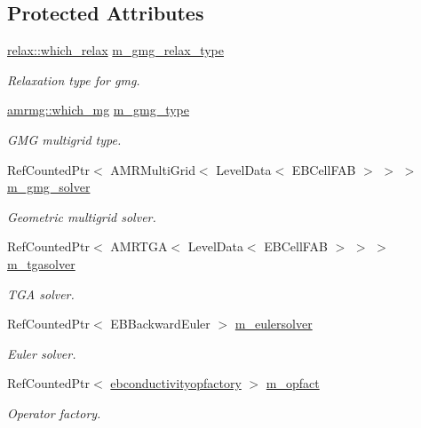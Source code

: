 \subsection*{Protected Attributes}
\begin{DoxyCompactItemize}
\item 
\hyperlink{namespacerelax_a1b017edf55c06d103aa5b61e015fe219}{relax\+::which\+\_\+relax} \hyperlink{classcdr__tga_a1eb73ad38e244760997def4a09d3c7a8}{m\+\_\+gmg\+\_\+relax\+\_\+type}
\begin{DoxyCompactList}\small\item\em Relaxation type for gmg. \end{DoxyCompactList}\item 
\hyperlink{namespaceamrmg_aa3e75c1253c968e52106305f762a7952}{amrmg\+::which\+\_\+mg} \hyperlink{classcdr__tga_a0731f3db4b058621e8430d1c0c02c19c}{m\+\_\+gmg\+\_\+type}
\begin{DoxyCompactList}\small\item\em G\+MG multigrid type. \end{DoxyCompactList}\item 
Ref\+Counted\+Ptr$<$ A\+M\+R\+Multi\+Grid$<$ Level\+Data$<$ E\+B\+Cell\+F\+AB $>$ $>$ $>$ \hyperlink{classcdr__tga_ab3222ef3ea322d5a4dc32c1692812794}{m\+\_\+gmg\+\_\+solver}
\begin{DoxyCompactList}\small\item\em Geometric multigrid solver. \end{DoxyCompactList}\item 
Ref\+Counted\+Ptr$<$ A\+M\+R\+T\+GA$<$ Level\+Data$<$ E\+B\+Cell\+F\+AB $>$ $>$ $>$ \hyperlink{classcdr__tga_aec60f3a7d5ba0a02cbf860bd309f0988}{m\+\_\+tgasolver}
\begin{DoxyCompactList}\small\item\em T\+GA solver. \end{DoxyCompactList}\item 
Ref\+Counted\+Ptr$<$ E\+B\+Backward\+Euler $>$ \hyperlink{classcdr__tga_a333fc9ca388b6b94defca87c7e2ed065}{m\+\_\+eulersolver}
\begin{DoxyCompactList}\small\item\em Euler solver. \end{DoxyCompactList}\item 
Ref\+Counted\+Ptr$<$ \hyperlink{classebconductivityopfactory}{ebconductivityopfactory} $>$ \hyperlink{classcdr__tga_a56cc5421ad5cf91341b866cf002e5377}{m\+\_\+opfact}
\begin{DoxyCompactList}\small\item\em Operator factory. \end{DoxyCompactList}\item 

\end{DoxyCompactItemize}
